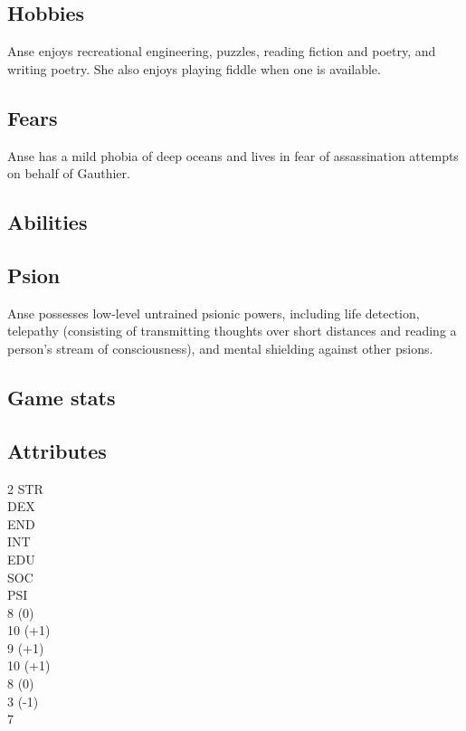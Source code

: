 \documentclass[12pt,a4paper,twocolumn]{article}
\begin{document}
\subsection{Hobbies}
\indent Anse enjoys recreational engineering, puzzles, reading fiction and poetry, and writing poetry. She also enjoys playing fiddle when one is available.

\subsection{Fears}
Anse has a mild phobia of deep oceans and lives in fear of assassination attempts on behalf of Gauthier.
	
	\begin{strip}
		\section{Abilities}
	\end{strip}
	
	
	\subsection{Psion}
	Anse possesses low-level untrained psionic powers, including life detection, telepathy (consisting of transmitting thoughts over short distances and reading a person's stream of consciousness), and mental shielding against other psions.
	
	
	\clearpage
	\begin{strip}
		\section{Game stats}
	\end{strip}
	
	
	\subsection{Attributes}
	\begin{multicols}{2}
		\noindent STR\\
		DEX\\
		END\\
		INT\\
		EDU\\
		SOC\\
		PSI\\
		8 (0)\\
		10 (+1)\\
		9 (+1)\\
		10 (+1)\\
		8 (0)\\
		3 (-1)\\
		7
		
		
	\end{multicols}
	
\end{document}
